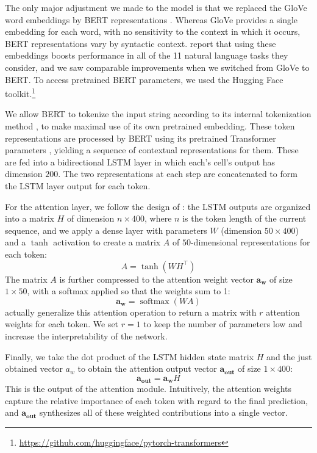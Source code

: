 \documentclass[11pt,a4paper]{article}
\DeclareMathOperator{\softmax}{softmax}
\newcommand{\aout}{\mathbf{a_{\text{out}}}}
\begin{document}
The only major adjustment we made to the model is that we replaced the GloVe word embeddings \citep{Pennington:2014} by BERT representations \citep{Devlin:2018}. Whereas GloVe provides a single embedding for each word, with no sensitivity to the context in which it occurs, BERT representations vary by syntactic context. \citeauthor{Devlin:2018} report that using these embeddings boosts performance in all of the 11 natural language tasks they consider, and we saw comparable improvements when we switched from GloVe to BERT. To access pretrained BERT parameters, we used the Hugging Face toolkit.\footnote{\url{https://github.com/huggingface/pytorch-transformers}}

We allow BERT to tokenize the input string according to its internal tokenization method \citep{wu2016google}, to make maximal use of its own pretrained embedding. These token representations are processed by BERT using its pretrained Transformer parameters \citep{Vaswani:2017}, yielding a sequence of contextual representations for them. These are fed into a bidirectional LSTM layer in which each's cell's output has dimension $200$. The two representations at each step are concatenated to form the LSTM layer output for each token.

For the attention layer, we follow the design of \citeauthor{Lin:2017}: the LSTM outputs are organized into a matrix $H$ of dimension $n \times 400$, where $n$ is the token length of the current sequence, and we apply a dense layer with parameters $W$ (dimension $50 \times 400$) and a $\tanh$ activation to create a matrix $A$ of $50$-dimensional representations for each token:
\begin{equation}
  A = \tanh(WH^{\top}) \label{eq:A}
\end{equation}
%
The matrix $A$ is further compressed to the attention weight vector $\mathbf{a_w}$ of size $1 \times 50$, with a softmax applied so that the weights sum to 1:
%
\begin{equation}
  \mathbf{a_w} = \softmax(WA) \label{eq:attn}
\end{equation}
%
\citeauthor{Lin:2017} actually generalize this attention operation to return a matrix with $r$ attention weights for each token. We set $r=1$ to keep the number of parameters low and increase the interpretability of the network.

Finally, we take the dot product of the LSTM hidden state matrix $H$ and the just obtained vector $a_w$ to obtain the attention output vector $\aout$ of size $1 \times 400$:
%
\begin{equation}
  \aout = \mathbf{a_w}H \label{eq:aout}
\end{equation}
%
This is the output of the attention module. Intuitively, the attention weights capture the relative importance of each token with regard to the final prediction, and $\aout$ synthesizes all of these weighted contributions into a single vector.
\end{document}
